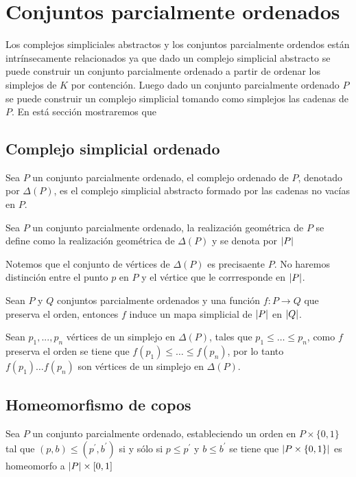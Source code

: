 \chapter{Conjuntos parcialmente ordenados}
Los complejos simpliciales abstractos y los conjuntos parcialmente ordendos están intrínsecamente relacionados ya que dado un complejo simplicial abstracto se puede construir un conjunto parcialmente ordenado a partir de ordenar los simplejos de $K$ por contención. Luego dado un conjunto parcialmente ordenado $P$ se puede construir un complejo simplicial tomando como simplejos las cadenas de $P$. 
En está sección mostraremos que 
\section{Complejo simplicial ordenado}
\begin{Defi}
Sea $P$ un conjunto parcialmente ordenado, el complejo ordenado de $P$, denotado por $\Delta(P)$, es el complejo simplicial abstracto formado por las cadenas no vacías en $P$.
\end{Defi}

\begin{Defi}
Sea $P$ un conjunto parcialmente ordenado, la realización geométrica de $P$ se define como la realización geométrica de $\Delta(P)$ y se denota por $\left| P \right|$ 
\end{Defi}

Notemos que el conjunto de vértices de $\Delta(P)$ es precisaente $P$. No haremos distinción entre el punto $p$ en $P$ y el vértice que le corrresponde en $\left| P \right|$.
\begin{Teo}
Sean $P$ y $Q$ conjuntos parcialmente ordenados y una función $f\colon P \rightarrow Q$ que preserva el orden, entonces $f$ induce un mapa simplicial de $\left| P \right|$ en $\left| Q \right|$.
\end{Teo}
\begin{Dem}
Sean $p_1,...,p_n$ vértices de un simplejo en $\Delta(P)$, tales que $p_1\leqslant\dots \leqslant p_n$, como $f$ preserva el orden se tiene que $f(p_1)\leqslant\dots \leqslant f(p_n)$, por lo tanto $f(p_1)\dots f(p_n)$ son vértices de un simplejo en $\Delta(P)$. 
\end{Dem}

\section{Homeomorfismo de copos}
\begin{Teo}
Sea $P$ un conjunto parcialmente ordenado, estableciendo un orden en $P\times\{0,1\}$ tal que $(p,b)\leq (p^{'},b^{'})$ si y sólo si $p\leq p^{'}$ y $b\leq b^{'}$ se tiene que $\left| P\times\{0,1\} \right|$ es homeomorfo a $\left| P \right|\times[0,1]$
\end{Teo} 

